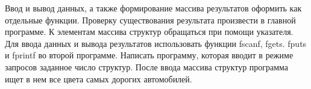 Ввод и вывод данных, а также формирование массива результатов оформить как отдельные функции. Проверку существования результата произвести в главной программе. К элементам массива структур обращаться при помощи указателя. Для ввода данных и вывода результатов использовать функции fscanf, fgets. fputs и fprintf во второй программе.
Написать программу, которая вводит в режиме запросов заданное число структур.
После ввода массива структур программа ищет в нем все цвета самых дорогих автомобилей.
